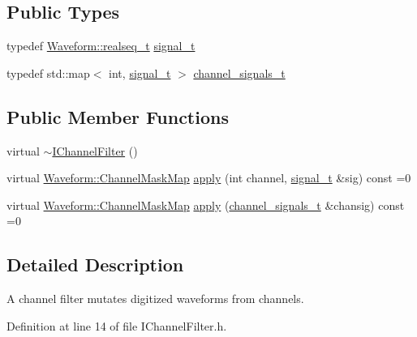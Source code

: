 \subsection*{Public Types}
\begin{DoxyCompactItemize}
\item 
typedef \hyperlink{namespace_wire_cell_1_1_waveform_a479175e541c8545e87cd8063b74b6956}{Waveform\+::realseq\+\_\+t} \hyperlink{class_wire_cell_1_1_i_channel_filter_a434ed96cc4b805fa0eeec14f9f8d85e9}{signal\+\_\+t}
\item 
typedef std\+::map$<$ int, \hyperlink{class_wire_cell_1_1_i_channel_filter_a434ed96cc4b805fa0eeec14f9f8d85e9}{signal\+\_\+t} $>$ \hyperlink{class_wire_cell_1_1_i_channel_filter_a44de35ce47701d84cd45393c6bcd5e2f}{channel\+\_\+signals\+\_\+t}
\end{DoxyCompactItemize}
\subsection*{Public Member Functions}
\begin{DoxyCompactItemize}
\item 
virtual \hyperlink{class_wire_cell_1_1_i_channel_filter_a25e462786015d136cb57367c945524cb}{$\sim$\+I\+Channel\+Filter} ()
\item 
virtual \hyperlink{namespace_wire_cell_1_1_waveform_a18b9ae61c858e340252ba3ac83ac3bc0}{Waveform\+::\+Channel\+Mask\+Map} \hyperlink{class_wire_cell_1_1_i_channel_filter_a6981186ee38a4b9b66e16c0d9b376b08}{apply} (int channel, \hyperlink{class_wire_cell_1_1_i_channel_filter_a434ed96cc4b805fa0eeec14f9f8d85e9}{signal\+\_\+t} \&sig) const =0
\item 
virtual \hyperlink{namespace_wire_cell_1_1_waveform_a18b9ae61c858e340252ba3ac83ac3bc0}{Waveform\+::\+Channel\+Mask\+Map} \hyperlink{class_wire_cell_1_1_i_channel_filter_a47554d77b1dca5596dc61e2221e0a137}{apply} (\hyperlink{class_wire_cell_1_1_i_channel_filter_a44de35ce47701d84cd45393c6bcd5e2f}{channel\+\_\+signals\+\_\+t} \&chansig) const =0
\end{DoxyCompactItemize}


\subsection{Detailed Description}
A channel filter mutates digitized waveforms from channels. 

Definition at line 14 of file I\+Channel\+Filter.\+h.




